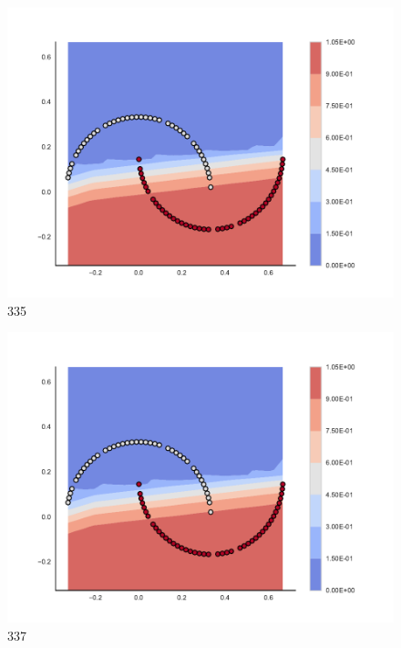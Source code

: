\begin{subfigure}[b]{0.09\textwidth}
    \includegraphics[clip, trim=2.35cm 1.75cm 4.5cm 0cm,width=\textwidth]{img/convergence/335.pdf}
    \caption{335}
    \label{fig:convergence_335}
\end{subfigure}
%
\begin{subfigure}[b]{0.09\textwidth}
    \includegraphics[clip, trim=2.35cm 1.75cm 4.5cm 0cm,width=\textwidth]{img/convergence/337.pdf}
    \caption{337}
    \label{fig:convergence_337}
\end{subfigure}
%
